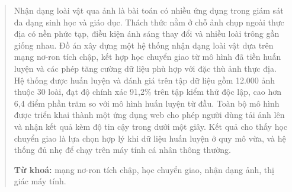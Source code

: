 \begin{abstract}

\begin{chuy}
\end{chuy}

\begin{mau}
Nhận dạng loài vật qua ảnh là bài toán có nhiều ứng dụng trong giám sát đa
dạng sinh học và giáo dục. Thách thức nằm ở chỗ ảnh chụp ngoài thực địa có
nền phức tạp, điều kiện ánh sáng thay đổi và nhiều loài trông gần giống
nhau. Đồ án xây dựng một hệ thống nhận dạng loài vật dựa trên mạng nơ-ron
tích chập, kết hợp học chuyển giao từ mô hình đã tiền huấn luyện và các phép
tăng cường dữ liệu phù hợp với đặc thù ảnh thực địa. Hệ thống được huấn
luyện và đánh giá trên tập dữ liệu gồm 12.000 ảnh thuộc 30 loài, đạt độ
chính xác 91,2\% trên tập kiểm thử độc lập, cao hơn 6,4 điểm phần trăm so
với mô hình huấn luyện từ đầu. Toàn bộ mô hình được triển khai thành một ứng
dụng web cho phép người dùng tải ảnh lên và nhận kết quả kèm độ tin cậy
trong dưới một giây. Kết quả cho thấy học chuyển giao là lựa chọn hợp lý khi
dữ liệu huấn luyện ở quy mô vừa, và hệ thống đủ nhẹ để chạy trên máy tính
cá nhân thông thường.

\vspace{0.8em}
\noindent\textbf{Từ khoá:} mạng nơ-ron tích chập, học chuyển giao, nhận dạng
ảnh, thị giác máy tính.
\end{mau}

\end{abstract}
